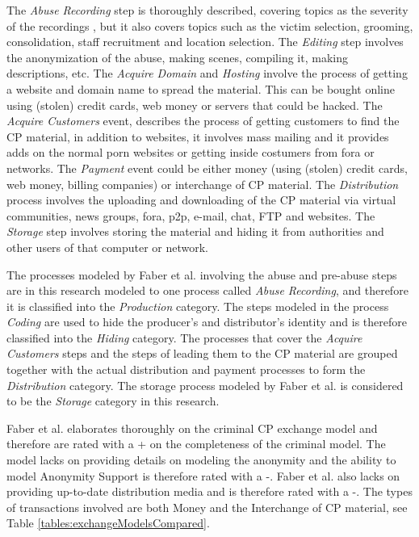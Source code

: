 \documentclass{sig-alternate-br}
\begin{document}
The \textit{Abuse Recording} step is thoroughly described, covering topics as the severity of the recordings \cite{quayle2002paedophiles}, but it also covers topics such as the victim selection, grooming, consolidation, staff recruitment and location selection. The \textit{Editing} step involves the anonymization of the abuse, making scenes, compiling it, making descriptions, etc. The \textit{Acquire Domain} and \textit{Hosting} involve the process of getting a website and domain name to spread the material. This can be bought online using (stolen) credit cards, web money or servers that could be hacked. The \textit{Acquire Customers} event, describes the process of getting customers to find the CP material, in addition to websites, it involves mass mailing and it provides adds on the normal porn websites or getting inside costumers from fora or networks. The \textit{Payment} event could be either money (using (stolen) credit cards, web money, billing companies) or interchange of CP material. The \textit{Distribution} process involves the uploading and downloading of the CP material via virtual communities, news groups, fora, p2p, e-mail, chat, FTP and websites. The \textit{Storage} step involves storing the material and hiding it from authorities and other users of that computer or network.

The processes modeled by Faber et al. involving the abuse and pre-abuse steps are in this research modeled to one process called \textit{Abuse Recording}, and therefore it is classified into the \textit{Production} category. The steps modeled in the process \textit{Coding} are used to hide the producer's and distributor's identity and is therefore classified into the \textit{Hiding} category. The processes that cover the \textit{Acquire Customers} steps and the steps of leading them to the CP material are grouped together with the actual distribution and payment processes to form the \textit{Distribution} category. The storage process modeled by Faber et al. is considered to be the \textit{Storage} category in this research.

Faber et al. elaborates thoroughly on the criminal CP exchange model and therefore are rated with a + on the completeness of the criminal model. The model lacks on providing details on modeling the anonymity and the ability to model Anonymity Support is therefore rated with a -. Faber et al. also lacks on providing up-to-date distribution media and is therefore rated with a -. The types of transactions involved are both Money and the Interchange of CP material, see Table \ref{tables:exchangeModelsCompared}.
\end{document}
